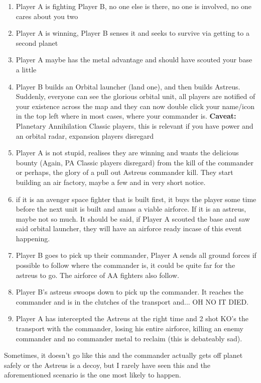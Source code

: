 \documentclass[]{article}
\begin{document}
\begin{enumerate}
	\item Player A is fighting Player B, no one else is there, no one is involved, no one cares about you two
	\item Player A is winning, Player B senses it and seeks to survive via getting to a second planet
	\item Player A maybe has the metal advantage and should have scouted your base a little
	\item Player B builds an Orbital launcher (land one), and then builds Astreus. Suddenly, everyone can see the glorious orbital unit, all players are notified of your existence across the map and they can now double click your name/icon in the top left where in most cases, where your commander is.  \textbf{Caveat:} Planetary Annihilation Classic players, this is relevant if you have power and an orbital radar, expansion players disregard
	\item Player A is not stupid, realises they are winning and wants the delicious bounty (Again, PA Classic players disregard)  from the kill of the commander or perhaps, the glory of a pull out Astreus commander kill.  They start building an air factory, maybe a few and in very short notice.  
	\item if it is an avenger space fighter that is built first, it buys the player some time before the next unit is built and amass a viable airforce.  If it is an astreus, maybe not so much.  It should be said, if Player A scouted the base and saw said orbital launcher, they will have an airforce ready incase of this event happening.  
	\item Player B goes to pick up their commander, Player A sends all ground forces if possible to follow where the commander is, it could be quite far for the astreus to go.  The airforce of AA fighters also follow.  
	\item Player B's astreus swoops down to pick up the commander.  It reaches the commander and is in the clutches of the transport and... OH NO IT DIED.  
	\item Player A has intercepted the Astreus at the right time and 2 shot KO's the transport with the commander, losing his entire airforce, killing an enemy commander and no commander metal to reclaim (this is debateably sad). 
\end{enumerate}

Sometimes, it doesn't go like this and the commander actually gets off planet safely or the Astreus is a decoy, but I rarely have seen this and the aforementioned scenario is the one most likely to happen.  
\end{document}
